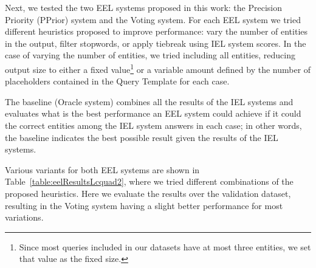 Next, we tested the two EEL systems proposed in this work: the Precision Priority (PPrior) system 
and the Voting system. For each EEL system we tried different heuristics proposed to improve 
performance: vary the number of entities in the output, filter stopwords, or apply tiebreak using 
IEL system scores. In the case of varying the number of entities, we tried including all entities, 
reducing output size to either a fixed value\footnote{Since most \SPARQL{} queries included in our 
datasets have at most three entities, we set that value as the fixed size. } or a variable amount 
defined by the number of placeholders contained in the Query Template for each case. 

The baseline (Oracle system) combines all the results of the IEL systems and evaluates what is 
the best performance an EEL system could achieve if it could  the correct entities among 
the IEL system answers in each case; in other words, the baseline indicates the best possible 
result given the results of the IEL systems. 

Various variants for both EEL systems are shown in Table~\ref{table:eelResultsLcquad2}, where we 
tried different combinations of the proposed heuristics. Here we evaluate the results over the 
\LCQuADtwo{} validation dataset, resulting in the Voting system having a slight better performance 
for most variations. 

